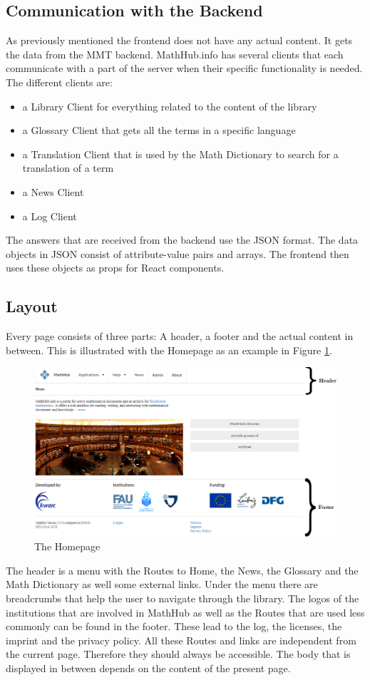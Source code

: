 \documentclass[11pt,a4paper]{article}
\begin{document}
\subsection{Communication with the Backend}
As previously mentioned the frontend does not have any actual content.
It gets the data from the MMT backend.
MathHub.info has several clients that each communicate with a part of the server when their specific functionality is needed.
The different clients are:
\begin{itemize}
\item a Library Client for everything related to the content of the library
\item a Glossary Client that gets all the terms in a specific language
\item a Translation Client that is used by the Math Dictionary to search for a translation of a term 
\item a News Client
\item a Log Client
\end{itemize}
The answers that are received from the backend use the JSON format.
The data objects in JSON consist of attribute-value pairs and arrays.
The frontend then uses these objects as props for React components.
\newpage
\subsection{Layout}
Every page consists of three parts: A header, a footer and the actual content in between.
This is illustrated with the Homepage as an example in Figure \ref{fig:home}.
\begin{figure}[H]
\includegraphics[width=1\textwidth]{home2.png}
\caption{The Homepage}
\label{fig:home}
\end{figure}
The header is a menu with the Routes to Home, the News, the Glossary and the Math Dictionary as well some external links.
Under the menu there are breadcrumbs that help the user to navigate through the library.
\newline \newline
The logos of the institutions that are involved in MathHub as well as the Routes that are used less commonly can be found in the footer.
These lead to the log, the licenses, the imprint and the privacy policy.
All these Routes and links are independent from the current page.
Therefore they should always be accessible.
The body that is displayed in between depends on the content of the present page.
\newpage
\end{document}
